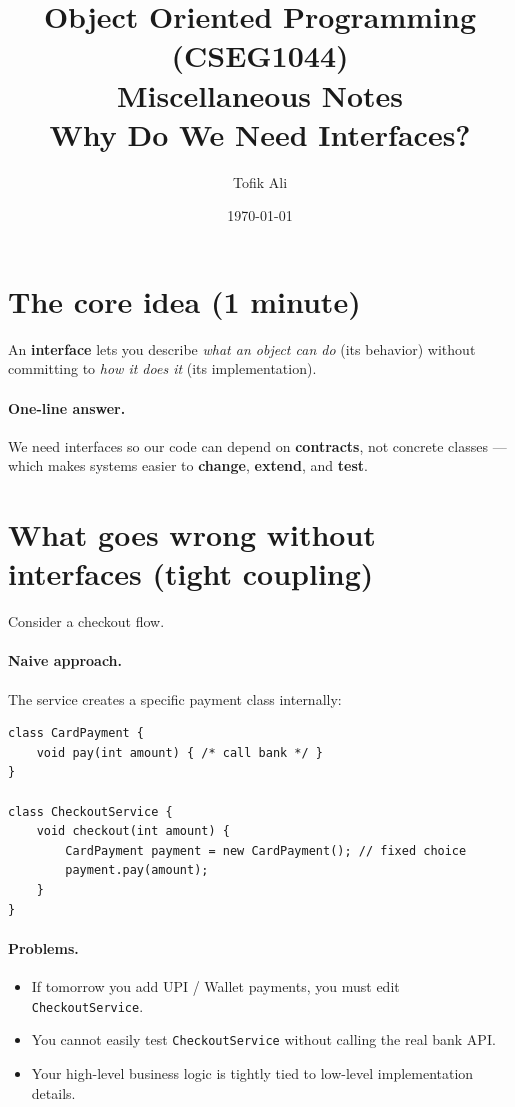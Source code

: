 \documentclass[11pt]{article}
\title{Object Oriented Programming (CSEG1044)\\Miscellaneous Notes\\Why Do We Need Interfaces?}
\author{Tofik Ali}
\date{\today}
\begin{document}
\maketitle

\section*{The core idea (1 minute)}
An \textbf{interface} lets you describe \textit{what an object can do} (its behavior) without committing to \textit{how it does it} (its implementation).

\paragraph{One-line answer.} We need interfaces so our code can depend on \textbf{contracts}, not concrete classes --- which makes systems easier to \textbf{change}, \textbf{extend}, and \textbf{test}.

\section*{What goes wrong without interfaces (tight coupling)}
Consider a checkout flow.

\paragraph{Naive approach.} The service creates a specific payment class internally:
\begin{lstlisting}
class CardPayment {
    void pay(int amount) { /* call bank */ }
}

class CheckoutService {
    void checkout(int amount) {
        CardPayment payment = new CardPayment(); // fixed choice
        payment.pay(amount);
    }
}
\end{lstlisting}

\paragraph{Problems.}
\begin{itemize}
  \item If tomorrow you add UPI / Wallet payments, you must edit \texttt{CheckoutService}.
  \item You cannot easily test \texttt{CheckoutService} without calling the real bank API.
  \item Your high-level business logic is tightly tied to low-level implementation details.
\end{itemize}
\end{document}
